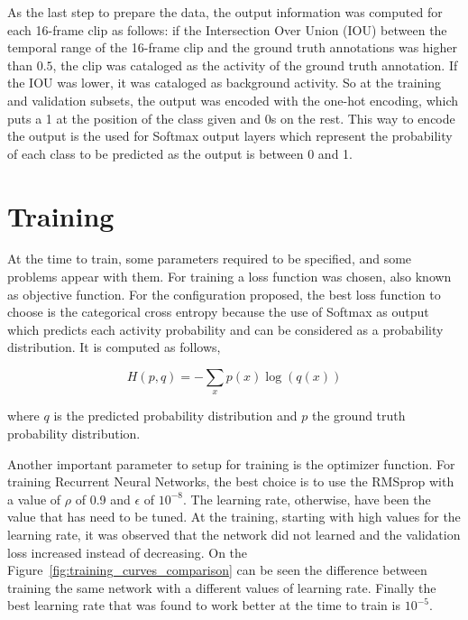 As the last step to prepare the data, the output information was computed for each 16-frame clip as follows: if the Intersection Over Union (IOU) between the temporal range of the 16-frame clip and the ground truth annotations was higher than $0.5$, the clip was cataloged as the activity of the ground truth annotation. If the IOU was lower, it was cataloged as background activity. So at the training and validation subsets, the output was encoded with the one-hot encoding, which puts a 1 at the position of the class given and 0s on the rest. This way to encode the output is the used for Softmax output layers which represent the probability of each class to be predicted as the output is between 0 and 1.



\section{Training}

At the time to train, some parameters required to be specified, and some problems appear with them. For training a loss function was chosen, also known as objective function. For the configuration proposed, the best loss function to choose is the categorical cross entropy because the use of Softmax as output which predicts each activity probability and can be considered as a probability distribution. It is computed as follows,

\begin{equation}
	H(p,q) = - \sum_x p(x) \log(q(x))
\end{equation}

where $q$ is the predicted probability distribution and $p$ the ground truth probability distribution.

Another important parameter to setup for training is the optimizer function. For training Recurrent Neural Networks, the best choice is to use the RMSprop\cite{dauphin2015rmsprop} with a value of $\rho$ of 0.9 and $\epsilon$ of $10^{-8}$. The learning rate, otherwise, have been the value that has need to be tuned. At the training, starting with high values for the learning rate, it was observed that the network did not learned and the validation loss increased instead of decreasing. On the Figure~\ref{fig:training_curves_comparison} can be seen the difference between training the same network with a different values of learning rate. Finally the best learning rate that was found to work better at the time to train is $10^{-5}$.

